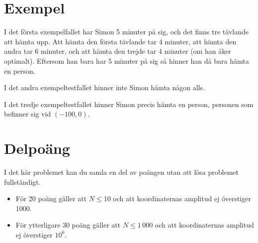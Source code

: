 \section*{Exempel}
I det första exempelfallet har Simon 5 minuter på sig, och det finns tre
tävlande att hämta upp. Att hämta den första tävlande tar 4 minuter, att hämta
den andra tar 6 minuter, och att hämta den trejde tar 4 minuter (om han åker
optimalt). Eftersom han bara har 5 minuter på sig så hinner han då bara hämta
en person.

I det andra exempeltestfallet hinner inte Simon hämta någon alls.

I det tredje exempeltestfallet hinner Simon precis hämta en person, personen
som befinner sig vid $(-100, 0)$.

\section*{Delpoäng}
I det här problemet kan du samla en del av poängen utan att lösa problemet
fullständigt.

\begin{itemize}
    \item För 20 poäng gäller att $N \leq 10$ och att koordinaternas amplitud
          ej överstiger 1000.
    \item För ytterligare 30 poäng gäller att $N \leq 1\,000$ och att koordinaternas
          amplitud ej överstiger $10^6$.
\end{itemize}
